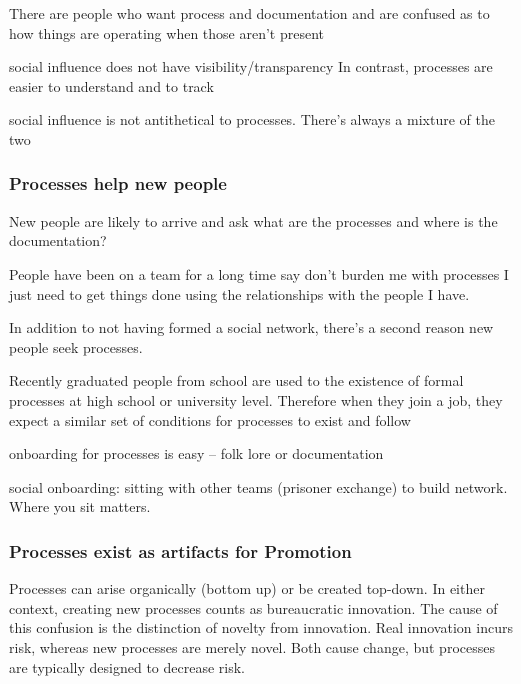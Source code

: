 There are people who want process and documentation and are confused as to how things are operating when those aren't present


social influence does not have visibility/transparency
In contrast, processes are easier to understand and to track

social influence is not antithetical to processes. There's always a mixture of the two


\subsubsection{Processes help new people}

New people are likely to arrive and ask what are the processes and where is the documentation?

People have been on a team for a long time say don't burden me with processes I just need to get things done using the relationships with the people I have.

In addition to not having formed a social network, there's a second reason new people seek processes.

Recently graduated people from school are used to the existence of formal processes at high school or university level. Therefore when they join a job, they expect a similar set of conditions for processes to exist and follow

onboarding for processes is easy -- folk lore or documentation

social onboarding: sitting with other teams (prisoner exchange) to build network.
Where you sit matters.

\subsubsection{Processes exist as artifacts for Promotion}

Processes can arise organically (bottom up) or be created top-down. In either context, creating new processes counts as bureaucratic innovation. The cause of this confusion is the distinction of novelty from innovation. Real innovation incurs risk, whereas new processes are merely novel. Both cause change, but processes are typically designed to decrease risk. 

